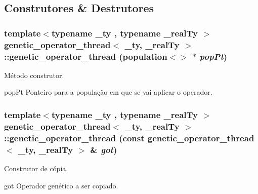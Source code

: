 \subsection{Construtores \& Destrutores}
\hypertarget{classgenetic__operator__thread_a2b60b46c5d55135436590f6aa2b11da3}{
\subsubsection[{genetic\_\-operator\_\-thread}]{\setlength{\rightskip}{0pt plus 5cm}template$<$typename \_\-ty , typename \_\-realTy $>$ {\bf genetic\_\-operator\_\-thread}$<$ \_\-ty, \_\-realTy $>$::{\bf genetic\_\-operator\_\-thread} ({\bf population}$<$$>$ $\ast$ {\em popPt})}}
\label{classgenetic__operator__thread_a2b60b46c5d55135436590f6aa2b11da3}
Método construtor.

popPt Ponteiro para a população em que se vai aplicar o operador. \hypertarget{classgenetic__operator__thread_adb72da6103f5995bd4c265789e5eceac}{
\subsubsection[{genetic\_\-operator\_\-thread}]{\setlength{\rightskip}{0pt plus 5cm}template$<$typename \_\-ty , typename \_\-realTy $>$ {\bf genetic\_\-operator\_\-thread}$<$ \_\-ty, \_\-realTy $>$::{\bf genetic\_\-operator\_\-thread} (const {\bf genetic\_\-operator\_\-thread}$<$ \_\-ty, \_\-realTy $>$ \& {\em got})}}
\label{classgenetic__operator__thread_adb72da6103f5995bd4c265789e5eceac}
Construtor de cópia.

got Operador genético a ser copiado. 

